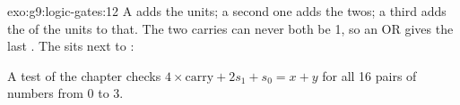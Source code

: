 \begin{solution}{exo:g9:logic-gates:12}
A  adds the units; a second one adds the twos; a third adds the
 of the units to that. The two carries can never both be 1, so an OR
gives the last . The  sits next to :

\label{lst:g9:logic-gates:sol-adder}

A test of the chapter checks $4 \times \text{carry} + 2 s_1 + s_0 = x + y$ for
all 16 pairs of numbers from 0 to 3.
\end{solution}

